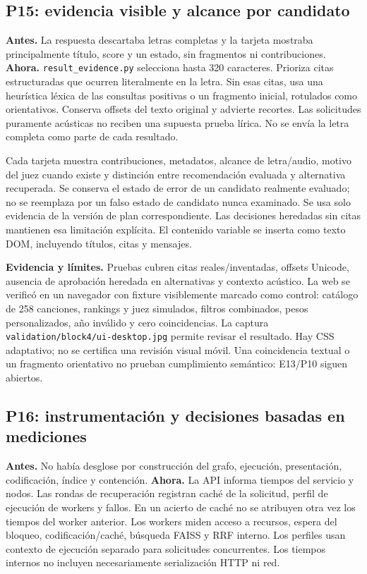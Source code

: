\subsection{P15: evidencia visible y alcance por candidato}
\textbf{Antes.} La respuesta descartaba letras completas y la tarjeta mostraba
principalmente título, score y un estado, sin fragmentos ni contribuciones.
\textbf{Ahora.} \texttt{result\_evidence.py} selecciona hasta 320 caracteres.
Prioriza citas estructuradas que ocurren literalmente en la letra. Sin esas
citas, usa una heurística léxica de las consultas positivas o un fragmento
inicial, rotulados como orientativos. Conserva offsets del texto original y
advierte recortes. Las solicitudes puramente acústicas no reciben una supuesta
prueba lírica. No se envía la letra completa como parte de cada resultado.

Cada tarjeta muestra contribuciones, metadatos, alcance de letra/audio, motivo
del juez cuando existe y distinción entre recomendación evaluada y alternativa
recuperada. Se conserva el estado de error de un candidato realmente evaluado;
no se reemplaza por un falso estado de candidato nunca examinado. Se usa solo
evidencia de la versión de plan correspondiente. Las decisiones heredadas sin
citas mantienen esa limitación explícita. El contenido variable se inserta como
texto DOM, incluyendo títulos, citas y mensajes.

\textbf{Evidencia y límites.} Pruebas cubren citas reales/inventadas, offsets
Unicode, ausencia de aprobación heredada en alternativas y contexto acústico.
La web se verificó en un navegador con fixture visiblemente marcado como
control: catálogo de 258 canciones, rankings y juez simulados, filtros
combinados, pesos personalizados, año inválido y cero coincidencias. La captura
\texttt{validation/block4/ui-desktop.jpg} permite revisar el resultado. Hay CSS
adaptativo; no se certifica una revisión visual móvil. Una coincidencia textual
o un fragmento orientativo no prueban cumplimiento semántico: E13/P10 siguen abiertos.

\subsection{P16: instrumentación y decisiones basadas en mediciones}
\textbf{Antes.} No había desglose por construcción del grafo, ejecución,
presentación, codificación, índice y contención. \textbf{Ahora.} La API informa
tiempos del servicio y nodos. Las rondas de recuperación registran caché de la
solicitud, perfil de ejecución de workers y fallos. En un acierto de caché no se
atribuyen otra vez los tiempos del worker anterior. Los workers miden acceso a
recursos, espera del bloqueo, codificación/caché, búsqueda FAISS y RRF interno.
Los perfiles usan contexto de ejecución separado para solicitudes concurrentes.
Los tiempos internos no incluyen necesariamente serialización HTTP ni red.

